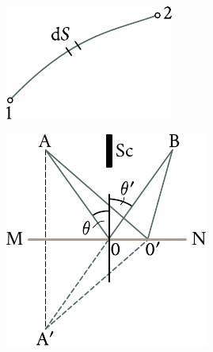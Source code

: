\begin{figure}[t]
	\begin{minipage}[t]{0.48\linewidth}
		\begin{center}
			\includegraphics[scale=1]{figures/ch_16/fig_16_6.pdf}
			\caption[]{}
			\label{fig:16_6}
		\end{center}
	\end{minipage}
	\hfill{ }%
	\begin{minipage}[t]{0.48\linewidth}
		\begin{center}
			\includegraphics[scale=1]{figures/ch_16/fig_16_7.pdf}
            \caption[]{}
			\label{fig:16_7}
		\end{center}
	\end{minipage}
\vspace{-0.4cm}
\end{figure}

